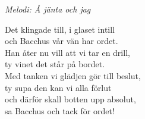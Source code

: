 {\footnotesize\textit{Melodi: Å jänta och jag}}\par
\vspace{10pt}
Det klingade till, i glaset intill\\
och Bacchus vår vän har ordet.\\
Han åter nu vill att vi tar en drill,\\
ty vinet det står på bordet.\\
Med tanken vi glädjen gör till beslut,\\
ty supa den kan vi alla förlut\\
och därför skall botten upp absolut,\\
sa Bacchus och tack för ordet!
